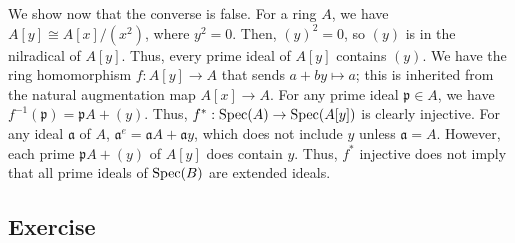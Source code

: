 We show now that the converse is false. For a ring $A$, we have $A[y] \cong A[x]/(x^2)$, where $y^2 = 0$. Then, $(y)^2 = 0$, so $(y)$ is in the nilradical of $A[y]$. Thus, every prime ideal of 
$A[y]$ contains $(y)$. We have the ring homomorphism $f : A[y] \to A$ that sends $a + by \mapsto a$; this is inherited from the natural augmentation map $A[x] \to A$. For any prime ideal $\mathfrak{p} \in A$,
we have $f^{-1}(\mathfrak{p}) = \mathfrak{p}A + (y)$. Thus, $f^* : \operatorname{Spec}(A) \to \operatorname{Spec}(A[y])$ is clearly injective. For any ideal $\mathfrak{a}$ of $A$, $\mathfrak{a}^e = \mathfrak{a}A + \mathfrak{a}y$, which
does not include $y$ unless $\mathfrak{a} = A$. However, each prime $\mathfrak{p}A + (y)$ of $A[y]$ does contain $y$. Thus, $f^*$ injective does not imply that all prime ideals of $\operatorname{Spec}(B)$ are extended ideals.

\subsection{Exercise}\label{3.21}

